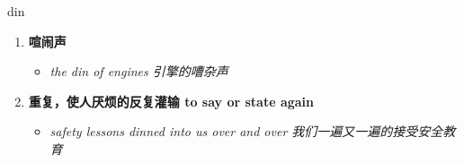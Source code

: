 
\begin{frame}
{\huge din}
\begin{center}
\begin{enumerate}\Large
  \item \textbf{喧闹声}
  \begin{itemize}
    \item \em{\Large{the din of engines 引擎的嘈杂声}}
  \end{itemize}
  \item \textbf{重复，使人厌烦的反复灌输 to say or state again}
  \begin{itemize}
    \item \em{\Large{safety lessons dinned into us over and over 我们一遍又一遍的接受安全教育}}
  \end{itemize}
\end{enumerate}
\end{center}
\end{frame}
